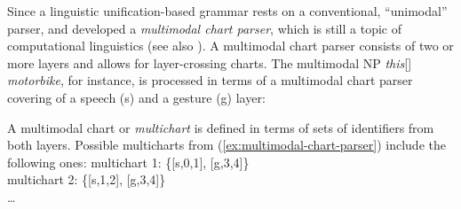 \documentclass[output=paper]{langsci/langscibook}
\begin{document}
Since a linguistic unification-based grammar rests on a conventional, \enquote{unimodal} parser, \citet{Johnston:1998} and \citet{Johnston:et:al:1997} developed a \emph{multimodal chart parser}, which is still a topic of computational linguistics \citep{Alahverdzhieva:Flickinger:Lascarides:2012} (see also ).
%
A multimodal chart parser consists of two or more layers and allows for layer-crossing charts.
%
The multimodal NP \emph{this}[\Pointing] \emph{motorbike}, for instance, is processed in terms of a multimodal chart parser covering of a speech (s) and a gesture (g) layer:
%
\ea \label{ex:multimodal-chart-parser}
\z

A multimodal chart or \emph{multichart}  is defined in terms of sets of identifiers from both layers.
%
Possible multicharts from (\ref{ex:multimodal-chart-parser}) include the following ones:
%
\ea
multichart 1: \{[s,0,1], [g,3,4]\} \\
multichart 2: \{[s,1,2], [g,3,4]\} \\
\ldots
\z
{}

\end{document}

